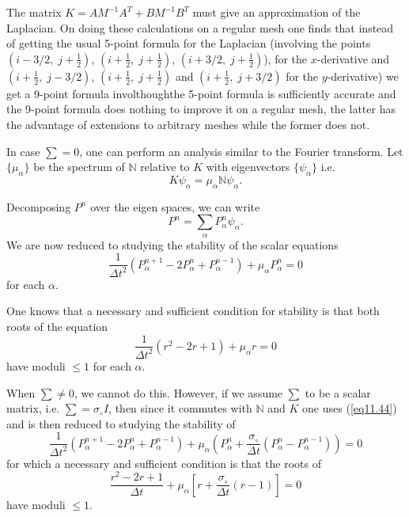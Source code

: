 \begin{remark}\label{chap11:rem11.2}
The matrix $K = AM^{-1} A^T  + BM^{-1} B^T$ must give an approximation
of the Laplacian. On doing these calculations on a regular mesh one
finds that instead of getting the usual 5-point formula for the
Laplacian (involving the points $(i-3/2, \; j + \frac{1}{2})$,
$(i+\frac{1}{2}, \; j+ \frac{1}{2})$, $(i+ 
3/2, \; j + \frac{1}{2})$), for the $x$-derivative and
$(i+\frac{1}{2}, \; j -3/2)$, $(i+\frac{1}{2}, \; j + \frac{1}{2})$
and $(i+\frac{1}{2}, \; j + 3/2)$ for the $y$-derivative) we get a
9-point formula involthough\pageoriginale the 5-point formula is
sufficiently accurate and the 9-point formula does nothing to improve
it on a regular mesh, the latter has the advantage of extensions to
arbitrary meshes while the former does not.  
\end{remark}

In case $\sum =0$, one can perform an analysis similar to the Fourier
transform. Let $\{\mu_\alpha\}$ be the spectrum of $\mathbb{N}$
relative to $K$ with eigenvectors $\{\psi_\alpha\}$ i.e. 
\begin{equation*}
K \psi_\alpha = \mu_\alpha \mathbb{N} \psi_\alpha. \tag{11.43}\label{eq11.43}
\end{equation*}

Decomposing  $P^n$ over the eigen spaces, we can write 
\begin{equation*}
P^n = \sum\limits_\alpha P^n_\alpha \psi_\alpha. \tag{11.44}\label{eq11.44}
\end{equation*}
We are now reduced to studying the stability of the scalar equations
\begin{equation*}
\frac{1}{\Delta t^2} (P^{n+1}_\alpha - 2 P^n_\alpha + P^{n-1}_\alpha)
+ \mu_\alpha P^n_\alpha = 0\tag{11.45}\label{eq11.45} 
\end{equation*}
for each $\alpha$. 

One knows that a necessary and sufficient condition for stability is
that both roots of the equation  
\begin{equation*}
\frac{1}{\Delta t^2} (r^2 - 2r + 1) + \mu_\alpha r = 0\tag{11.46}\label{eq11.46}
\end{equation*}
have moduli $\leq 1$ for each $\alpha$. 

When $\sum \neq 0$, we cannot do this. However, if we assume $\sum$ to
be a scalar matrix, i.e. $\sum = \sigma_\circ I$, then since it
commutes with $\mathbb{N}$ and $K$ one uses (\ref{eq11.44}) and is
then reduced to studying the stability of  
\begin{equation*}
\frac{1}{\Delta t^2} (P^{n+1}_\alpha - 2 P^n_\alpha + P^{n-1}_\alpha) + \mu_\alpha (P^n_\alpha + \frac{\sigma_\circ}{\Delta t} (P^{n}_\alpha - P^{n-1}_\alpha)) =0\tag{11.47}\label{eq11.47}
\end{equation*}
for which a necessary and sufficient condition is that the roots of 
\begin{equation*}
\frac{r^2 - 2r + 1}{\Delta t} + \mu_\alpha \left[ r+ \frac{\sigma_\circ}{\Delta t} (r-1)\right] = 0\tag{11.48}\label{eq11.48}
\end{equation*}\pageoriginale
have moduli $\leq 1$. 

